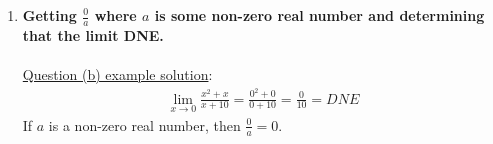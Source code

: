 \documentclass[reqno,psamsfonts]{amsart}
\theoremstyle{definition}
\theoremstyle{remark}
\numberwithin{equation}{section}
\begin{document}
\begin{enumerate}
\\
\item \textbf{Getting $\frac{0}{a}$ where $a$ is some non-zero real number and determining that the limit DNE.}
\\
\\\underline{Question (b) example solution}:
\begin{align*}
\lim\limits_{x\to 0}\frac{x^2+x}{x+10}=\frac{0^2+0}{0+10}=\frac{0}{10}=DNE
\end{align*}
If $a$ is a non-zero real number, then $\frac{0}{a}=0$.

\end{enumerate}
\end{document}
